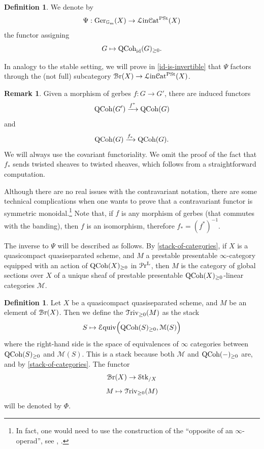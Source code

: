 \documentclass[11pt, twoside]{article} %
\numberwithin{equation}{section}
\theoremstyle{plain}
\theoremstyle{definition}
\newtheorem{defin}[thm]{Definition}
\newtheorem{rem}[thm]{Remark}
\newcommand{\Equiv}{\mathcal{E}\textup{quiv}}
\newcommand{\Gm}{\mathbb G_{\mathrm{m}}}
\newcommand{\id}{\textup{id}}
\newcommand{\QCoh}{\textup{QCoh}}
\renewcommand{\Pr}{\mathcal P\textup{r}}
\newcommand{\Triv}{\mathcal{T}\textup{riv}}
\newcommand{\cM}{\mathcal M}
\newcommand{\cBr}{\mathcal{B}\textup{r}}
\newcommand{\Ger}{\textup{Ger}}
\newcommand{\Stk}{{\mathcal S\textup{tk}}}
\newcommand{\Linpre}{{\mathcal L\textup{in}\mathcal{C}\textup{at}^{\textup{PSt}}}}
\begin{document}
 \begin{defin}\label{functor-psi}We denote by $$\Psi:\Ger_{\Gm}(X)\to \Linpre(X)$$ the functor assigning
	$$G\mapsto \QCoh_\id(G)_{\geq 0}.$$\end{defin}
  
	
	
 In analogy to the stable setting, we will prove in \cref{id-is-invertible} that $\Psi$ factors through the (not full) subcategory $\cBr(X)\to \Linpre(X)$. 


 	\begin{rem}Given a morphism of gerbes $f:G\to G'$, there are induced functors $$\QCoh(G')\xrightarrow{f^*} \QCoh(G)$$ and $$\QCoh(G)\xrightarrow{f_*}\QCoh(G).$$ We will always use the covariant functoriality. We omit the proof of the fact that $f_*$ sends twisted sheaves to twisted sheaves, which follows from a straightforward computation.
	
	Although there are no real issues with the contravariant notation, there are some technical complications when one wants to prove that a contravariant functor is symmetric monoidal.\footnote{In fact, one would need to use the construction of the ``opposite of an $\infty$-operad'', see \cite{MO-opposite-operad}, \cite[Remark 2.4.2.7]{HA}.} Note that, if $f$ is any morphism of gerbes (that commutes with the banding), then $f$ is an isomorphism, therefore $f_*=(f^*)^{-1}$.
	\end{rem}
	
	 The inverse to $\Psi$ will be described as follows. By \cref{stack-of-categories}, if $X$ is a quasicompact quasiseparated scheme, and $M$ a prestable presentable $\infty$-category equipped with an action of $\QCoh(X)_{\geq 0}$ in $\Pr^{\textup{L}}$, then $M$ is the category of global sections over $X$ of a unique sheaf of prestable presentable $\QCoh(X)_{\geq 0}$-linear categories $\cM$.
	
	\begin{defin}\label{defin-triv}
		Let $X$ be a quasicompact quasiseparated scheme, and $M$ be an element of $\cBr(X)$. Then we define the $\Triv_{\geq 0}(M)$ as the stack $$S \mapsto\Equiv\Big( \QCoh(S)_{\geq 0},\cM(S)\Big)$$ where the right-hand side is the space of equivalences of $\infty$ categories between $\QCoh(S)_{\geq 0}$ and $\cM(S)$. This is a stack because both $\cM$ and $\QCoh(-)_{\geq 0}$ are, and by \cref{stack-of-categories}.
  The functor $$\cBr(X)\to \Stk_{/X}$$
  $$M\mapsto \Triv_{\geq 0}(M)$$ will be denoted by $\Phi$.
	\end{defin}
\end{document}
